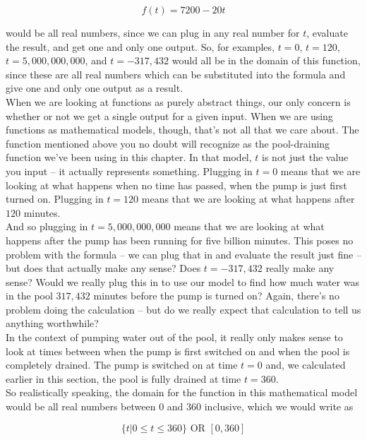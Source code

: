 \begin{equation*}
	f(t)=7200-20t
\end{equation*}

would be all real numbers, since we can plug in any real number for $t$, evaluate the result, and get one and only one output. So, for examples, $t=0$, $t=120$, $t=5,000,000,000$, and $t=-317,432$ would all be in the domain of this function, since these are all real numbers which can be substituted into the formula and give one and only one output as a result.\\

When we are looking at functions as purely abstract things, our only concern is whether or not we get a single output for a given input. When we are using functions as mathematical models, though, that’s not all that we care about. The function mentioned above you no doubt will recognize as the pool-draining function we’ve been using in this chapter. In that model, $t$ is not just the value you input – it actually represents something. Plugging in $t=0$ means that we are looking at what happens when no time has passed, when the pump is just first turned on. Plugging in $t=120$ means that we are looking at what happens after $120$ minutes.\\

And so plugging in $t=5,000,000,000$ means that we are looking at what happens after the pump has been running for five billion minutes. This poses no problem with the formula – we can plug that in and evaluate the result just fine – but does that actually make any sense? Does $t=-317,432$ really make any sense? Would we really plug this in to use our model to find how much water was in the pool $317,432$ minutes before the pump is turned on? Again, there’s no problem
doing the calculation – but do we really expect that calculation to tell us anything worthwhile?\\

In the context of pumping water out of the pool, it really only makes sense to look at times between when the pump is first switched on and when the pool is completely drained. The pump is switched on at time $t=0$ and, we calculated earlier in this section, the pool is fully drained at time $t=360$.\\

So realistically speaking, the domain for the function in this mathematical model would be all real numbers between $0$ and $360$ inclusive, which we would write as

\begin{equation*}
	\{t|0 \leq t \leq 360\} \text{    OR    } [0,360]
\end{equation*}

